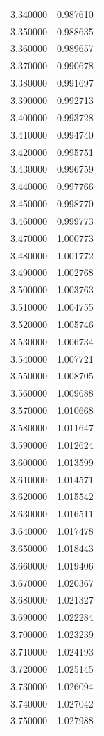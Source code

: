\begin{tabular}{rr}
3.340000 & 0.987610 \\
3.350000 & 0.988635 \\
3.360000 & 0.989657 \\
3.370000 & 0.990678 \\
3.380000 & 0.991697 \\
3.390000 & 0.992713 \\
3.400000 & 0.993728 \\
3.410000 & 0.994740 \\
3.420000 & 0.995751 \\
3.430000 & 0.996759 \\
3.440000 & 0.997766 \\
3.450000 & 0.998770 \\
3.460000 & 0.999773 \\
3.470000 & 1.000773 \\
3.480000 & 1.001772 \\
3.490000 & 1.002768 \\
3.500000 & 1.003763 \\
3.510000 & 1.004755 \\
3.520000 & 1.005746 \\
3.530000 & 1.006734 \\
3.540000 & 1.007721 \\
3.550000 & 1.008705 \\
3.560000 & 1.009688 \\
3.570000 & 1.010668 \\
3.580000 & 1.011647 \\
3.590000 & 1.012624 \\
3.600000 & 1.013599 \\
3.610000 & 1.014571 \\
3.620000 & 1.015542 \\
3.630000 & 1.016511 \\
3.640000 & 1.017478 \\
3.650000 & 1.018443 \\
3.660000 & 1.019406 \\
3.670000 & 1.020367 \\
3.680000 & 1.021327 \\
3.690000 & 1.022284 \\
3.700000 & 1.023239 \\
3.710000 & 1.024193 \\
3.720000 & 1.025145 \\
3.730000 & 1.026094 \\
3.740000 & 1.027042 \\
3.750000 & 1.027988 \\

\end{tabular}
